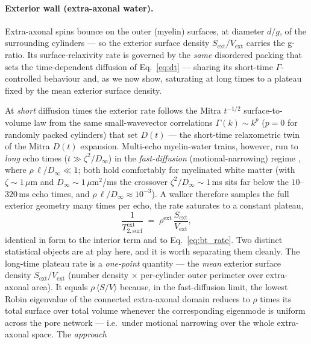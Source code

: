 \paragraph{Exterior wall (extra-axonal water).} Extra-axonal spins bounce on the
outer (myelin) surfaces, at diameter $d/g$, of the surrounding cylinders --- so the
exterior surface density $S_{\mathrm{ext}}/V_{\mathrm{ext}}$ carries the g-ratio.
Its surface-relaxivity rate is governed by the \emph{same} disordered packing that sets
the time-dependent diffusion of Eq.~\eqref{eq:dt} --- sharing its short-time
$\Gamma$-controlled behaviour and, as we now show, saturating at long times to a plateau
fixed by the mean exterior surface density.

At \emph{short} diffusion times the exterior rate follows the Mitra $t^{-1/2}$
surface-to-volume law \citep{Mitra1992, Mitra1993} from the same small-wavevector
correlations $\Gamma(k)\sim k^p$ ($p=0$ for randomly packed cylinders) that set $D(t)$
\citep{NovikovKiselev2010} --- the short-time relaxometric twin of the Mitra $D(t)$
expansion. Multi-echo myelin-water trains, however, run to \emph{long} echo times
($t\gg\zeta^2/D_\infty$) in the \emph{fast-diffusion} (motional-narrowing) regime
\citep{Brownstein1979}, where $\rho\,\ell/D_\infty\ll1$; both hold comfortably for
myelinated white matter (with $\zeta\!\sim\!1\,\mu$m and $D_\infty\!\sim\!1\,\mu$m$^2$/ms
the crossover $\zeta^2/D_\infty\!\sim\!1$\,ms sits far below the $10$--$320$\,ms echo
times, and $\rho\,\ell/D_\infty\!\approx\!10^{-3}$). A walker therefore samples the full
exterior geometry many times per echo, the rate saturates to a constant plateau,
\begin{equation}
  \frac{1}{T_{2,\mathrm{surf}}^{\mathrm{ext}}}
  \;=\; \rho^{\mathrm{ext}}\,\frac{S_{\mathrm{ext}}}{V_{\mathrm{ext}}},
  \label{eq:b_ext_long}
\end{equation}
identical in form to the interior term and to Eq.~\eqref{eq:bt_rate}. Two distinct
statistical objects are at play here, and it is worth separating them cleanly. The long-time
plateau rate is a \emph{one-point} quantity --- the \emph{mean} exterior surface density
$S_{\mathrm{ext}}/V_{\mathrm{ext}}$ (number density $\times$ per-cylinder outer perimeter over
extra-axonal area). It equals $\rho\,\langle S/V\rangle$ because, in the fast-diffusion limit,
the lowest Robin eigenvalue of the connected extra-axonal domain reduces to $\rho$ times its
total surface over total volume whenever the corresponding eigenmode is uniform across the pore
network --- i.e.\ under motional narrowing over the whole extra-axonal space. The \emph{approach}
